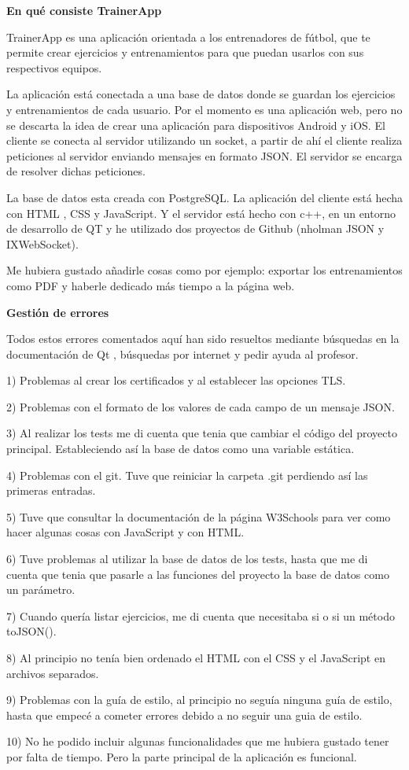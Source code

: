 



{\bfseries En qué consiste Trainer\+App}

Trainer\+App es una aplicación orientada a los entrenadores de fútbol, que te permite crear ejercicios y entrenamientos para que puedan usarlos con sus respectivos equipos.

La aplicación está conectada a una base de datos donde se guardan los ejercicios y entrenamientos de cada usuario. Por el momento es una aplicación web, pero no se descarta la idea de crear una aplicación para dispositivos Android y i\+OS. El cliente se conecta al servidor utilizando un socket, a partir de ahí el cliente realiza peticiones al servidor enviando mensajes en formato J\+S\+ON. El servidor se encarga de resolver dichas peticiones.

La base de datos esta creada con Postgre\+S\+QL. La aplicación del cliente está hecha con H\+T\+ML , C\+SS y Java\+Script. Y el servidor está hecho con c++, en un entorno de desarrollo de QT y he utilizado dos proyectos de Github (nholman J\+S\+ON y I\+X\+Web\+Socket).

Me hubiera gustado añadirle cosas como por ejemplo\+: exportar los entrenamientos como P\+DF y haberle dedicado más tiempo a la página web.

{\bfseries Gestión de errores}

Todos estos errores comentados aquí han sido resueltos mediante búsquedas en la documentación de Qt , búsquedas por internet y pedir ayuda al profesor.

1) Problemas al crear los certificados y al establecer las opciones T\+LS.

2) Problemas con el formato de los valores de cada campo de un mensaje J\+S\+ON.

3) Al realizar los tests me di cuenta que tenia que cambiar el código del proyecto principal. Estableciendo así la base de datos como una variable estática.

4) Problemas con el git. Tuve que reiniciar la carpeta .git perdiendo así las primeras entradas.

5) Tuve que consultar la documentación de la página W3\+Schools para ver como hacer algunas cosas con Java\+Script y con H\+T\+ML.

6) Tuve problemas al utilizar la base de datos de los tests, hasta que me di cuenta que tenia que pasarle a las funciones del proyecto la base de datos como un parámetro.

7) Cuando quería listar ejercicios, me di cuenta que necesitaba si o si un método to\+J\+S\+O\+N().

8) Al principio no tenía bien ordenado el H\+T\+ML con el C\+SS y el Java\+Script en archivos separados.

9) Problemas con la guía de estilo, al principio no seguía ninguna guía de estilo, hasta que empecé a cometer errores debido a no seguir una guia de estilo.

10) No he podido incluir algunas funcionalidades que me hubiera gustado tener por falta de tiempo. Pero la parte principal de la aplicación es funcional.



 